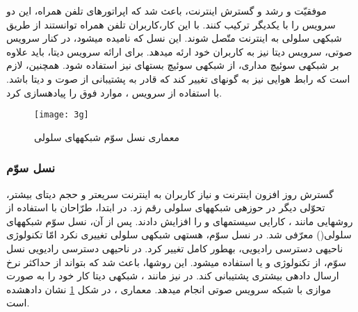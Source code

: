    موفقیّت  و رشد و گسترش اینترنت، باعث شد که اپراتورهای تلفن همراه، این دو سرویس را با یکدیگر ترکیب کنند. با این کار،کاربران تلفن همراه توانستند از طریق شبکه\nf ی سلولی به اینترنت متّصل شوند. این نسل که  نامیده می\nf شود، در کنار سرویس صوتی، سرویس دیتا نیز به کاربران خود ارئه می\nf دهد. برای ارائه سرویس دیتا، باید علاوه بر شبکه\nf ی سوئیچ مداری، از شبکه\nf ی سوئیچ بسته\nf ای نیز استفاده شود. همچنین، لازم است که رابط هوایی نیز به گونه\nf ای تغییر کند که قادر به پشتیبانی از صوت و دیتا باشد.  با استفاده از سرویس ، موارد فوق را پیاده\nf سازی کرد\cite{cox}. 
\begin{figure}[h]
\centering
\texttt{[image: 3g]}
\caption{معماری نسل سوّم شبکه\nf های سلولی}
\label{3g}
\end{figure}
   
\subsubsection{نسل سوّم}   
   گسترش روز افزون اینترنت و نیاز کاربران به اینترنت سریع\nf تر و حجم دیتای بیشتر، تحوّلی دیگر در حوزه\nf ی شبکه\nf های سلولی رقم زد. در ابتدا، طرّاحان با استفاده از روش\nf هایی مانند ، کارایی سیستم\nf های  و  را افزایش دادند. پس از آن، نسل سوّم شبکه\nf های سلولی() معرّفی شد. در نسل سوّم، هسته\nf ی شبکه\nf ی سلولی تغییری نکرد امّا تکنولوژی ناحیه\nf ی دسترسی رادیویی، به\nf طور کامل تغییر کرد. در ناحیه\nf ی دسترسی رادیویی نسل سوّم، از تکنولوژی  و یا  استفاده می\nf شود. این روش\nf ها، باعث شد که  بتواند از حداکثر نرخ ارسال داده\nf ی بیشتری پشتیبانی کند. در  نیز مانند ، شبکه\nf ی دیتا کار خود را به صورت موازی با شبکه سرویس صوتی انجام می\nf دهد. معماری ، در شکل \ref{3g} نشان داده\nf شده است\cite{cox}.



